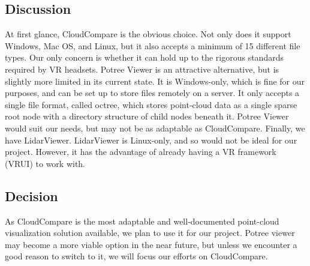 \documentclass{article}
\begin{document}
\subsection{Discussion}
At first glance, CloudCompare is the obvious choice. 
Not only does it support Windows, Mac OS, and Linux, but it also accepts a minimum of 15 different file types. 
Our only concern is whether it can hold up to the rigorous standards required by VR headsets. 
Potree Viewer is an attractive alternative, but is slightly more limited in its current state. 
It is Windows-only, which is fine for our purposes, and can be set up to store files remotely on a server. 
It only accepts a single file format, called octree, which stores point-cloud data as a single sparse root node with a directory structure of child nodes beneath it. 
Potree Viewer would suit our needs, but may not be as adaptable as CloudCompare. 
Finally, we have LidarViewer. LidarViewer is Linux-only, and so would not be ideal for our project. 
However, it has the advantage of already having a VR framework (VRUI) to work with.

\subsection{Decision}
As CloudCompare is the most adaptable and well-documented point-cloud visualization solution available, we plan to use it for our project. 
Potree viewer may become a more viable option in the near future, but unless we encounter a good reason to switch to it, we will focus our efforts on CloudCompare. 

\newpage


\end{document}
